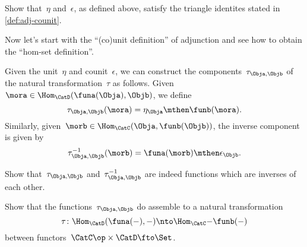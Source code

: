 \begin{exercise}
    \label{ex:eta-epsilon-triangle}
    Show that~$\eta$ and~$\epsilon$, as defined above, satisfy the triangle identites stated in \cref{def:adj-counit}.
\end{exercise}
\begin{solution}
\end{solution}

Now let's start with the ``(co)unit definition'' of adjunction and see how to obtain the ``hom-set definition''.

Given the unit~$\eta$ and counit~$\epsilon$, we can construct the components~$\tau_{\Obja,\Objb}$ of the natural transformation~$\tau$ as follows.
Given~$\mora \in \Hom_{\CatD}(\funa(\Obja),\Objb)$, we define
\begin{equation*}
    \tau_{\Obja,\Objb}(\mora) = \eta_\Obja \mthen \funb(\mora).
\end{equation*}
Similarly, given~$\morb \in \Hom_{\CatC}(\Obja,\funb(\Objb))$, the inverse component is given by
\begin{equation*}
    \tau_{\Obja,\Objb}^{-1}(\morb) = \funa(\morb) \mthen \epsilon_\Objb.
\end{equation*}

\begin{exercise}
    \label{ex:tau}
    Show that~$\tau_{\Obja,\Objb}$ and~$\tau_{\Obja,\Objb}^{-1}$ are indeed functions which are inverses of each other.
\end{exercise}
\begin{solution}
\end{solution}

\begin{exercise}
    \label{ex:tau2}
    Show that the functions~$\tau_{\Obja,\Objb}$ do assemble to a natural transformation
    \begin{equation*}
        \tau  \colon \Hom_{\CatD}(\funa(-) ,- ) \nto \Hom_{\CatC}{-}{\funb(-)}
    \end{equation*}
    between functors~$\CatC\op \times \CatD \fto \Set $.
\end{exercise}
\begin{solution}
\end{solution}
